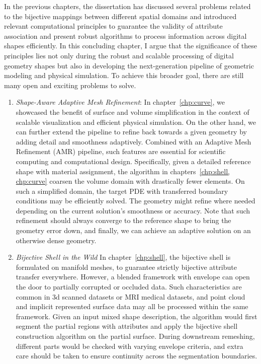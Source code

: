 In the previous chapters, the dissertation has discussed several problems related to the bijective mappings between different spatial domains and introduced relevant computational principles to guarantee the validity of attribute association and present robust algorithms to process information across digital shapes efficiently. 
In this concluding chapter, I argue that the significance of these principles lies not only during the robust and scalable processing of digital geometry shapes but also in developing the next-generation pipeline of geometric modeling and physical simulation. 
To achieve this broader goal, there are still many open and exciting problems to solve.

\begin{enumerate}
  \item \emph{Shape-Aware Adaptive Mesh Refinement}:
In chapter~\ref{chp:curve}, we showcased the benefit of surface and volume simplification in the context of scalable visualization and efficient physical simulation. 
On the other hand, we can further extend the pipeline to refine back towards a given geometry by adding detail and smoothness adaptively. Combined with an Adaptive Mesh Refinement (AMR) pipeline, such features are essential for scientific computing and computational design.
Specifically, given a detailed reference shape with material assignment, the algorithm in chapters~\ref{chp:shell, chp:curve} coarsen the volume domain with drastically fewer elements. 
On such a simplified domain, the target PDE with transferred boundary conditions may be efficiently solved. The geometry might refine where needed depending on the current solution's smoothness or accuracy. 
Note that such refinement should always converge to the reference shape to bring the geometry error down, and finally, we can achieve an adaptive solution on an otherwise dense geometry. 

\item \emph{Bijective Shell in the Wild} %
In chapter~\ref{chp:shell}, the bijective shell is formulated on manifold meshes, 
to guarantee strictly bijective attribute transfer everywhere.
However, a blended framework with envelope \cite{hu2018tetrahedral, Wang:2021} can open the door to partially corrupted or occluded data. 
Such characteristics are common in 3d scanned datasets or MRI medical datasets, and point cloud and implicit represented surface data may all be processed within the same framework.
Given an input mixed shape description, the algorithm would first segment the partial regions with attributes and apply the bijective shell construction algorithm on the partial surface. During downstream remeshing, different parts would be checked with varying envelope criteria, and extra care should be taken to ensure continuity across the segmentation boundaries. 


\end{enumerate}
